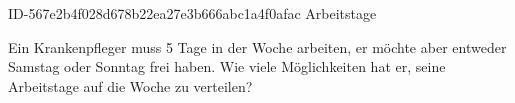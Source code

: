 \begin{exercise}
      {ID-567e2b4f028d678b22ea27e3b666abc1a4f0afac}
      {Arbeitstage}
  \ifproblem\problem\par
    Ein Krankenpfleger muss 5 Tage in der Woche arbeiten, er möchte aber
    entweder Samstag oder Sonntag frei haben. Wie viele Möglichkeiten hat
    er, seine Arbeitstage auf die Woche zu verteilen?
  \fi
\end{exercise}
